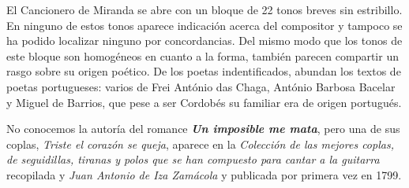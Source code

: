 El Cancionero de Miranda se abre con un bloque de 22 tonos breves sin estribillo. En ninguno de estos tonos aparece indicación acerca del compositor y tampoco se ha podido localizar ninguno por concordancias. Del mismo modo que los tonos de este bloque son homogéneos en cuanto a la forma, también parecen compartir un rasgo sobre su origen poético. De los poetas indentificados, abundan los textos de poetas portugueses: varios de Frei António das Chaga, António Barbosa Bacelar y Miguel de Barrios, que pese a ser Cordobés su familiar era de origen portugués.

No conocemos la autoría del romance \textbf{\textit{Un imposible me mata}}, pero una de sus coplas, \textit{Triste el corazón se queja}, aparece en la \textit{Colección de las mejores coplas, de seguidillas, tiranas y polos que se han compuesto para cantar a la guitarra} recopilada y \textit{Juan Antonio de Iza Zamácola} y publicada por primera vez en 1799.
